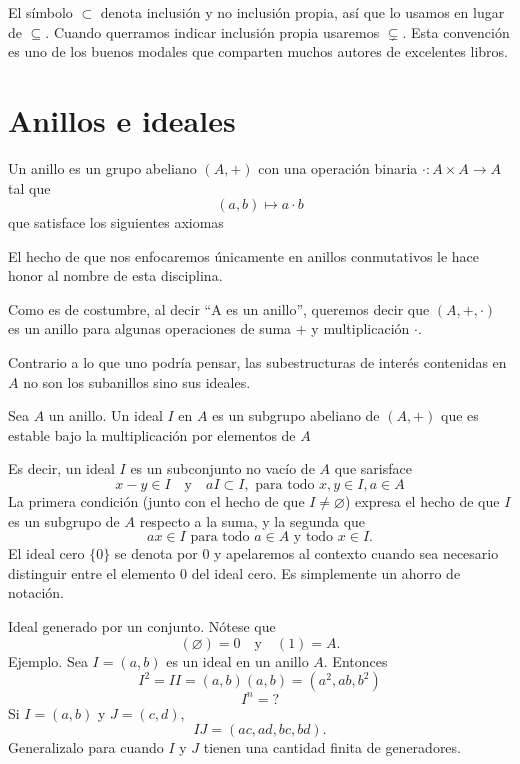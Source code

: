 \documentclass[b5paper,10pt]{book}
\begin{document}
El símbolo \(\subset\) denota inclusión y no inclusión propia,
así que lo usamos en lugar de \(\subseteq\).
Cuando querramos indicar inclusión propia usaremos \(\subsetneq\).	
Esta convención es uno de los buenos modales
que comparten muchos autores de excelentes libros.

\section{Anillos e ideales}



\begin{defi}
Un anillo es un grupo abeliano \((A,+)\) con una operación binaria
\(\cdot : A\times A\to A\) tal que
\[
	(a,b)\mapsto a\cdot b
\]
que satisface los siguientes axiomas
\end{defi}

El hecho de que nos enfocaremos únicamente
en anillos conmutativos le hace honor al nombre de 
esta disciplina.

Como es de costumbre, al decir 
``A es un anillo'', 
queremos decir que 
\((A,+,\cdot)\) es un anillo
para algunas operaciones de suma \(+\) y multiplicación \(\cdot\).

Contrario a lo que uno podría pensar,
las subestructuras de interés contenidas en \(A\)
no son los subanillos sino sus ideales.

\begin{defi}
Sea \(A\) un anillo.
Un ideal \(I\) en \(A\) es un subgrupo abeliano de \((A,+)\)
que es estable bajo la multiplicación por elementos de \(A\)
\end{defi}
Es decir, un ideal \(I\) es un subconjunto no vacío de \(A\) 
que sarisface
\[
x-y\in I\quad\text{y}\quad a I\subset I, \text{ para todo } x,y\in I, a \in A
\]
La primera condición (junto con el hecho de que \(I\neq \varnothing\))
expresa el hecho de que \(I\) es un subgrupo de \(A\) respecto a la suma,
y la segunda que 
\[
ax \in I \text{ para todo } a\in A \text{ y todo } x\in I.
\]
El ideal cero \(\{0\}\) se denota por \(0\)
y apelaremos al contexto cuando sea necesario
distinguir entre el elemento \(0\) del ideal cero.
Es simplemente un ahorro de notación.

Ideal generado por un conjunto.
Nótese que 
\[
(\varnothing) = 0\quad \text{y}\quad (1) = A.
\]
Ejemplo.
Sea \(I = (a,b)\) es un ideal en un anillo \(A\).
Entonces \[I^2 = II = (a,b)(a,b)= (a^2, ab, b^2)\]
\[
I^n = ? 
\]
Si \(I = (a,b)\) y \(J=(c,d)\),
\[
IJ = (ac,ad,bc,bd).
\]
Generalizalo para cuando \(I\) y \(J\) 
tienen una cantidad finita de generadores.
\end{document}
